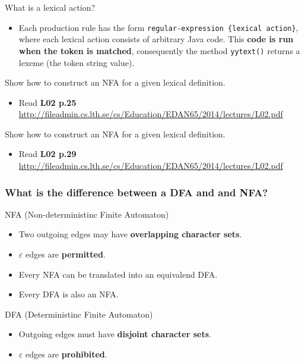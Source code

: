 \documentclass[11pt]{beamer}
\begin{document}
\begin{frame}

\begin{block}{What is a lexical action?}
\begin{itemize}
\item Each production rule has the form \texttt{regular-expression \{lexical action\}}, where each lexical action consists of arbitrary Java code. This \textbf{code is run when the token is matched}, consequently the method \texttt{yytext()} returns a lexeme (the token string value).
\end{itemize}
\end{block}

\begin{block}{Show how to construct an NFA for a given lexical definition.}
\begin{itemize}
\item Read \textbf{L02 p.25} \url{http://fileadmin.cs.lth.se/cs/Education/EDAN65/2014/lectures/L02.pdf}
\end{itemize}
\end{block}

\begin{block}{Show how to construct an NFA for a given lexical definition.}
\begin{itemize}
\item Read \textbf{L02 p.29} \url{http://fileadmin.cs.lth.se/cs/Education/EDAN65/2014/lectures/L02.pdf}
\end{itemize}
\end{block}

\end{frame}


\begin{frame}
\frametitle{What is the difference between a DFA and and NFA?}
\begin{block}{NFA (Non-deterministinc Finite Automaton)}
\begin{itemize}
\item Two outgoing edges may have \textbf{overlapping character sets}.
\item $\varepsilon$ edges are \textbf{permitted}.
\item Every NFA can be translated into an equivalend DFA.
\item Every DFA is also an NFA.
\end{itemize}
\end{block}

\begin{block}{DFA (Deterministinc Finite Automaton)}
\begin{itemize}
\item Outgoing edges must have \textbf{disjoint character sets}.
\item $\varepsilon$ edges are \textbf{prohibited}.
\end{itemize}
\end{block}

\end{frame}
\end{document}
